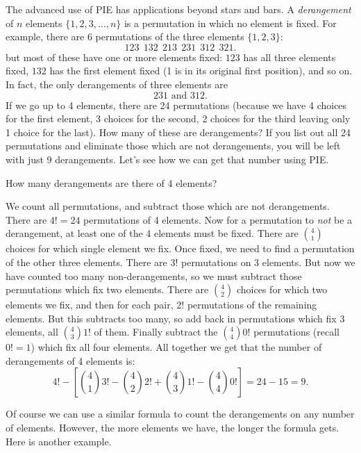 \documentclass[12pt]{article}
\begin{document}
The advanced use of PIE has applications beyond stars and bars.  A {\em derangement} of $n$ elements $\{1,2,3,\ldots, n\}$ is a permutation in which no element is fixed.  For example, there are $6$ permutations of the three elements $\{1,2,3\}$:
\[123 ~~ 132 ~~ 213 ~~ 231 ~~ 312 ~~ 321.\]
but most of these have one or more elements fixed: $123$ has all three elements fixed, $132$ has the first element fixed (1 is in its original first position), and so on.  In fact, the only derangements of three elements are
\[231 \mbox{  and  }312.\]
If we go up to 4 elements, there are 24 permutations (because we have 4 choices for the first element, 3 choices for the second, 2 choices for the third leaving only 1 choice for the last).  How many of these are derangements?  If you list out all 24 permutations and eliminate those which are not derangements, you will be left with just 9 derangements.  Let's see how we can get that number using PIE.

\begin{example}
  How many derangements are there of 4 elements?
  \begin{solution}
    We count all permutations, and subtract those which are not derangements.  There are $4! = 24$ permutations of 4 elements.  Now for a permutation to {\em not} be a derangement, at least one of the 4 elements must be fixed.  There are ${4 \choose 1}$ choices for which single element we fix.  Once fixed, we need to find a permutation of the other three elements. There are $3!$ permutations on 3 elements.  But now we have counted too many non-derangements, so we must subtract those permutations which fix two elements.  There are ${4 \choose 2}$ choices for which two elements we fix, and then for each pair, $2!$ permutations of the remaining elements.  But this subtracts too many, so add back in permutations which fix 3 elements, all ${4 \choose 3}1!$ of them.  Finally subtract the ${4 \choose 4}0!$ permutations (recall $0! = 1$) which fix all four elements.  All together we get that the number of derangements of 4 elements is:
    \[4! - \left[{4 \choose 1}3! - {4 \choose 2}2! + {4 \choose 3} 1! - {4 \choose 4}0!\right] = 24 - 15 = 9.\]

  \end{solution}

\end{example}

Of course we can use a similar formula to count the derangements on any number of elements.  However, the more elements we have, the longer the formula gets.  Here is another example.
\end{document}
